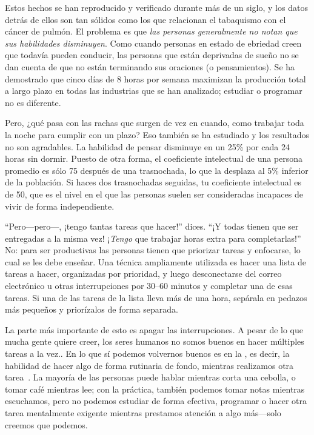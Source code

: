 Estos hechos se han reproducido y verificado durante más de un siglo,
y los datos detrás de ellos son tan sólidos como los que relacionan el tabaquismo con el cáncer de pulmón.
El problema es que
\emph{las personas generalmente no notan que sus habilidades disminuyen}.
Como cuando personas en estado de ebriedad creen que todavía pueden conducir,
las personas que están deprivadas de sueño no se dan cuenta de que
no están terminando sus oraciones (o pensamientos).
Se ha demostrado que cinco días de 8 horas por semana maximizan la producción total a largo plazo
en todas las industrias que se han analizado;
estudiar o programar no es diferente.

Pero, ¿qué pasa con las rachas que surgen de vez en cuando,
como trabajar toda la noche para cumplir con un plazo?
Eso también se ha estudiado
y los resultados no son agradables.
La habilidad de pensar disminuye en un 25\% por cada 24 horas sin dormir.
Puesto de otra forma,
el coeficiente intelectual de una persona promedio es sólo 75 después de una trasnochada,
lo que la desplaza al 5\% inferior de la población.
Si haces dos trasnochadas seguidas, tu coeficiente intelectual es de 50,
que es el nivel en el que las personas suelen ser consideradas incapaces de vivir de forma independiente.

``Pero---pero---, ¡tengo tantas tareas que hacer!'' dices.
``¡Y todas tienen que ser entregadas a la misma vez!
¡\emph{Tengo} que trabajar horas extra para completarlas!''
No:
para ser productivas las personas tienen que priorizar tareas y enfocarse,
lo cual se les debe enseñar.
Una técnica ampliamente utilizada es hacer una lista de tareas a hacer,
organizadas por prioridad,
y luego desconectarse del correo electrónico u otras interrupciones por 30--60 minutos
y completar una de esas tareas.
Si una de las tareas de la lista lleva más de una hora,
sepárala en pedazos más pequeños y priorízalos de forma separada.

La parte más importante de esto es apagar las interrupciones.
A pesar de lo que mucha gente quiere creer,
los seres humanos no somos buenos en hacer múltiples tareas a la vez..
En lo que sí podemos volvernos buenos es en la , es decir, 
la habilidad de hacer algo de forma rutinaria de fondo,
mientras realizamos otra tarea~\cite{Mill2016a}.
La mayoría de las personas puede hablar mientras corta una cebolla,
o tomar café mientras lee;
con la práctica,
también podemos tomar notas mientras escuchamos,
pero no podemos estudiar de forma efectiva,
programar
o hacer otra tarea mentalmente exigente mientras prestamos atención a algo más---solo
creemos que podemos.

